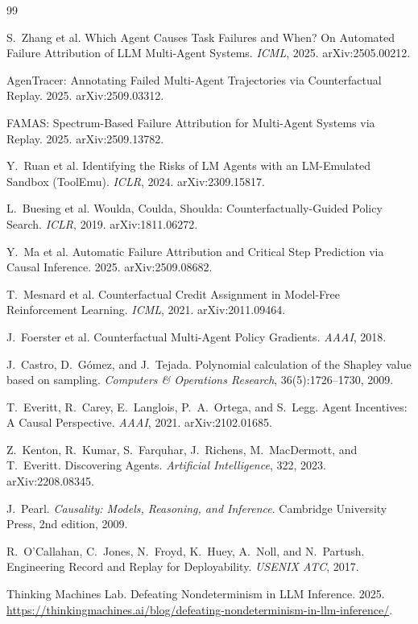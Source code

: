 \documentclass[11pt]{article}
\begin{document}
\begin{thebibliography}{99}

 S.~Zhang et al. Which Agent Causes Task Failures and When? On Automated Failure
Attribution of LLM Multi-Agent Systems. \emph{ICML}, 2025. arXiv:2505.00212.

 AgenTracer: Annotating Failed Multi-Agent Trajectories via Counterfactual
Replay. 2025. arXiv:2509.03312.

 FAMAS: Spectrum-Based Failure Attribution for Multi-Agent Systems via Replay.
2025. arXiv:2509.13782.

 Y.~Ruan et al. Identifying the Risks of LM Agents with an LM-Emulated Sandbox
(ToolEmu). \emph{ICLR}, 2024. arXiv:2309.15817.

 L.~Buesing et al. Woulda, Coulda, Shoulda: Counterfactually-Guided Policy Search.
\emph{ICLR}, 2019. arXiv:1811.06272.

 Y.~Ma et al. Automatic Failure Attribution and Critical Step Prediction
via Causal Inference. 2025. arXiv:2509.08682.

 T.~Mesnard et al. Counterfactual Credit Assignment in Model-Free
Reinforcement Learning. \emph{ICML}, 2021. arXiv:2011.09464.

 J.~Foerster et al. Counterfactual Multi-Agent Policy Gradients. \emph{AAAI},
2018.

 J.~Castro, D.~G\'omez, and J.~Tejada. Polynomial calculation of the Shapley
value based on sampling. \emph{Computers \& Operations Research}, 36(5):1726--1730, 2009.

 T.~Everitt, R.~Carey, E.~Langlois, P.~A.~Ortega, and S.~Legg. Agent
Incentives: A Causal Perspective. \emph{AAAI}, 2021. arXiv:2102.01685.

 Z.~Kenton, R.~Kumar, S.~Farquhar, J.~Richens, M.~MacDermott, and T.~Everitt.
Discovering Agents. \emph{Artificial Intelligence}, 322, 2023. arXiv:2208.08345.

 J.~Pearl. \emph{Causality: Models, Reasoning, and Inference}. Cambridge
University Press, 2nd edition, 2009.

 R.~O'Callahan, C.~Jones, N.~Froyd, K.~Huey, A.~Noll, and N.~Partush. Engineering
Record and Replay for Deployability. \emph{USENIX ATC}, 2017.

 Thinking Machines Lab. Defeating Nondeterminism in LLM Inference.
2025. \url{https://thinkingmachines.ai/blog/defeating-nondeterminism-in-llm-inference/}.

\end{thebibliography}
\end{document}
